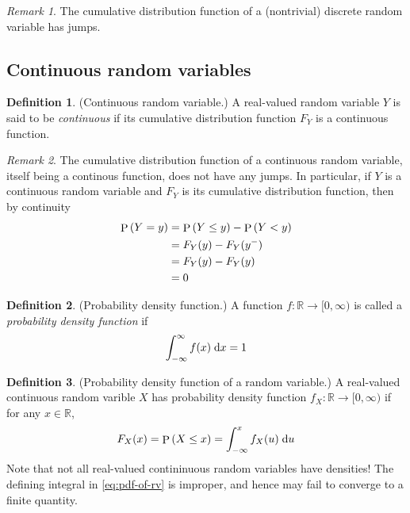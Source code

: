 \documentclass[11pt]{article}
\theoremstyle{definition}
\newtheorem{defn}{Definition}[section]
\theoremstyle{remark}
\newtheorem{rem}{Remark}[section]
\newcommand{\parens}[1]{\left(#1\right)}
\renewcommand{\d}{\mathrm{d}}
\newcommand{\intd}{\;\d}
\newcommand{\fromleft}{^-}
\newcommand{\infinfint}{%
    \ensuremath \int_{-\infty}^{\infty}
}
\newcommand{\intfrominf}{%
    \ensuremath \int_{-\infty}
}
\newcommand{\R}{\mathbb{R}}
\DeclareMathOperator{\Prob}{P}
\renewcommand{\P}[1]{\Prob{\parens{#1}}}
\newcommand{\cdf}{cumulative distribution function}
\newcommand{\pdf}{probability density function}
\newcommand{\Pdf}{Probability density function}
\begin{document}
\begin{rem}
    The \cdf{} of a (nontrivial) discrete random variable has jumps.
\end{rem}

\subsection{Continuous random variables}

\begin{defn}{(Continuous random variable.)}
    A real-valued random variable $Y$ is said to be \emph{continuous} if its
    \cdf{} $F_Y$ is a continuous function.
\end{defn}

\begin{rem}
    The \cdf{} of a continuous random variable, itself being a continous
    function, does not have any jumps.
    In particular, if $Y$ is a continuous random variable and $F_Y$ is its
    \cdf, then by continuity
    \begin{align}
        \P{Y = y}
        &= \P{Y \leq y} - \P{Y < y} \notag \\
        &= F_Y(y) - F_Y(y\fromleft) \notag \\
        &= F_Y(y) - F_Y(y) \notag \\
        &= 0
        \label{eq:point-probability-of-cts-rv-is-zero}
    \end{align}
\end{rem}

\begin{defn}{(\Pdf.)}
    \label{def:pdf}
    A function $f : \R \to [0, \infty)$ is called a \emph{\pdf{}} if
    \begin{equation}
        \label{eq:pdf}
        \infinfint{
            f(x) \intd x
        }
        = 1
    \end{equation}
\end{defn}

\begin{defn}{(\Pdf{} of a random variable.)}
    \label{def:pdf-of-rv}
    A real-valued continuous random varible $X$ has \pdf{}
    $f_X : \R \to [0, \infty)$
    if for any $x \in \R$,
    \begin{equation}
        \label{eq:pdf-of-rv}
        F_X(x) = \P{X \leq x} = \intfrominf^x {
            f_X(u) \intd u
        }
    \end{equation}
    Note that not all real-valued contininuous random variables have densities!
    The defining integral in \eqref{eq:pdf-of-rv} is improper, and hence may
    fail to converge to a finite quantity.
\end{defn}
\end{document}
